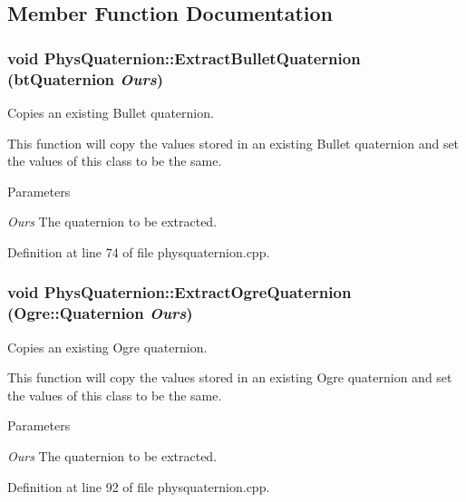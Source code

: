 \subsection{Member Function Documentation}
\hypertarget{classPhysQuaternion_a112b979d18c915cb719781949d74ff83}{
\subsubsection[{ExtractBulletQuaternion}]{\setlength{\rightskip}{0pt plus 5cm}void PhysQuaternion::ExtractBulletQuaternion (btQuaternion {\em Ours})}}
\label{d5/d19/classPhysQuaternion_a112b979d18c915cb719781949d74ff83}


Copies an existing Bullet quaternion. 

This function will copy the values stored in an existing Bullet quaternion and set the values of this class to be the same. 
\begin{DoxyParams}{Parameters}
\item[{\em Ours}]The quaternion to be extracted. \end{DoxyParams}


Definition at line 74 of file physquaternion.cpp.

\hypertarget{classPhysQuaternion_a63dd5036c86a5353094ad7b089ede3ab}{
\subsubsection[{ExtractOgreQuaternion}]{\setlength{\rightskip}{0pt plus 5cm}void PhysQuaternion::ExtractOgreQuaternion (Ogre::Quaternion {\em Ours})}}
\label{d5/d19/classPhysQuaternion_a63dd5036c86a5353094ad7b089ede3ab}


Copies an existing Ogre quaternion. 

This function will copy the values stored in an existing Ogre quaternion and set the values of this class to be the same. 
\begin{DoxyParams}{Parameters}
\item[{\em Ours}]The quaternion to be extracted. \end{DoxyParams}


Definition at line 92 of file physquaternion.cpp.

